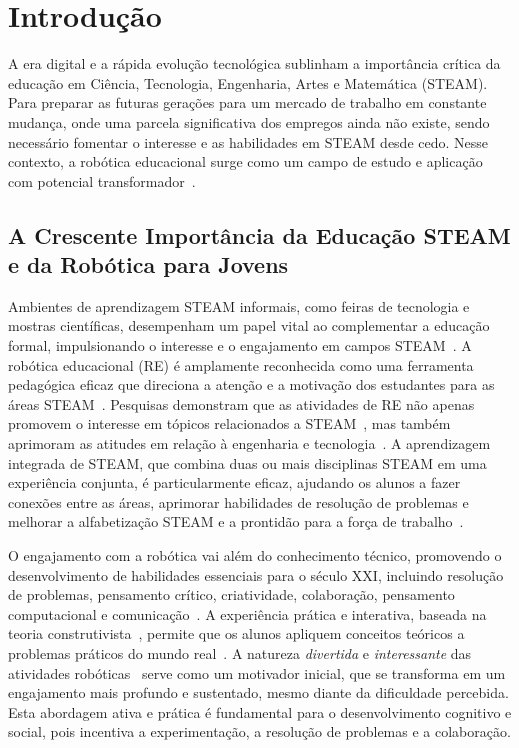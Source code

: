 \documentclass[%
  a4paper,%
  12pt,%
  fleqn,%
  english,%
  brazilian,%
]{article}
\begin{document}
% 

\section{Introdução}%
\label{sect:intro}
A era digital e a rápida evolução tecnológica sublinham a importância crítica da educação em Ciência, Tecnologia, Engenharia, Artes e Matemática (STEAM). Para preparar as futuras gerações para um mercado de trabalho em constante mudança, onde uma parcela significativa dos empregos ainda não existe, sendo necessário fomentar o interesse e as habilidades em STEAM desde cedo. Nesse contexto, a robótica educacional surge como um campo de estudo e aplicação com potencial transformador~\cite{meegleYouthRobotics2025}.

\subsection{A Crescente Importância da Educação STEAM e da Robótica para Jovens}
Ambientes de aprendizagem STEAM informais, como feiras de tecnologia e mostras científicas, desempenham um papel vital ao complementar a educação formal, impulsionando o interesse e o engajamento em campos STEAM~\cite{ross2024BeyondExhibits}. A robótica educacional (RE) é amplamente reconhecida como uma ferramenta pedagógica eficaz que direciona a atenção e a motivação dos estudantes para as áreas STEAM~\cite{cheung2024SummerLibraries}. Pesquisas demonstram que as atividades de RE não apenas promovem o interesse em tópicos relacionados a STEAM~\cite{ross2024BeyondExhibits}, mas também aprimoram as atitudes em relação à engenharia e tecnologia~\cite{cheung2024SummerLibraries}. A aprendizagem integrada de STEAM, que combina duas ou mais disciplinas STEAM em uma experiência conjunta, é particularmente eficaz, ajudando os alunos a fazer conexões entre as áreas, aprimorar habilidades de resolução de problemas e melhorar a alfabetização STEAM e a prontidão para a força de trabalho~\cite{ross2024BeyondExhibits}.

O engajamento com a robótica vai além do conhecimento técnico, promovendo o desenvolvimento de habilidades essenciais para o século XXI, incluindo resolução de problemas, pensamento crítico, criatividade, colaboração, pensamento computacional e comunicação~\cite{meegleYouthRobotics2025}. A experiência prática e interativa, baseada na teoria construtivista~\cite{ross2024BeyondExhibits}, permite que os alunos apliquem conceitos teóricos a problemas práticos do mundo real~\cite{meegleYouthRobotics2025}. A natureza \emph{divertida} e \emph{interessante} das atividades robóticas~\cite{cheung2024SummerLibraries} serve como um motivador inicial, que se transforma em um engajamento mais profundo e sustentado, mesmo diante da dificuldade percebida. Esta abordagem ativa e prática é fundamental para o desenvolvimento cognitivo e social, pois incentiva a experimentação, a resolução de problemas e a colaboração.
\end{document}

